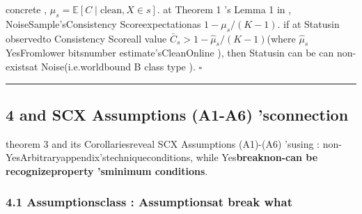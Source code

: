 \documentclass[
  12pt,
]{article}
\begin{document}
concrete ,  \(\mu_s = \mathbb{E}[C \mid \text{clean}, X \in s]\). at 
Theorem 1 's Lemma 1 in , NoiseSample'sConsistency Scoreexpectationas 
\(1 - \mu_s/(K-1)\). if at Statusin observedto Consistency Scoreall value 
\(\bar{C}_s > 1 - \hat{\mu}_s/(K-1)\)(where \(\hat{\mu}_s\)
YesFromlower bitsnumber estimate'sCleanOnline ), then Statusin can be can non-existsat Noise(i.e.worldbound  B
class type ). \(\square\)

\begin{center}\rule{0.5\linewidth}{0.5pt}\end{center}

\subsection{4 and  SCX Assumptions (A1-A6)
'sconnection}\label{ux4e0e-scx-ux5047ux8bbeux4f53ux7cfb-a1-a6-ux7684ux8054ux7cfb}

theorem  3 and its Corollariesreveal SCX Assumptions (A1)-(A6)
'susing : non-YesArbitraryappendix'stechniqueconditions, while Yes\textbf{breaknon-can be recognizeproperty 'sminimum conditions}. 

\subsubsection{4.1
Assumptionsclass : Assumptionsat break what}\label{ux5047ux8bbeux5206ux7c7bux54eaux4e9bux5047ux8bbeux5728ux6253ux7834ux4ec0ux4e48}
\end{document}

